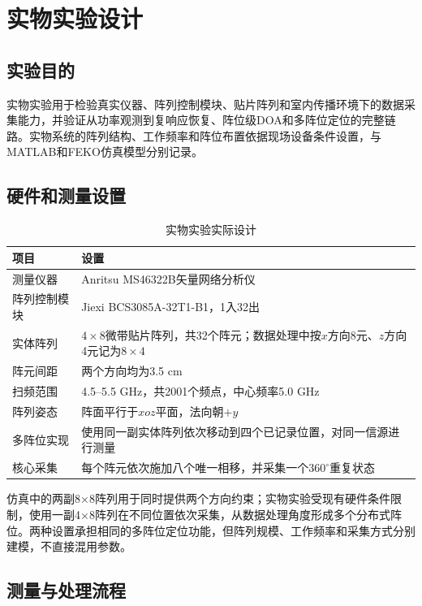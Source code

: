 \documentclass[UTF8,a4paper,12pt]{ctexart}
\begin{document}
\clearpage
\section{实物实验设计}

\subsection{实验目的}

实物实验用于检验真实仪器、阵列控制模块、贴片阵列和室内传播环境下的数据采集能力，并验证从功率观测到复响应恢复、阵位级DOA和多阵位定位的完整链路。实物系统的阵列结构、工作频率和阵位布置依据现场设备条件设置，与MATLAB和FEKO仿真模型分别记录。

\subsection{硬件和测量设置}

\begin{table}[htbp]
\centering
\caption{实物实验实际设计}
\begin{tabularx}{\textwidth}{p{3.2cm}Y}
\toprule
项目 & 设置\\
\midrule
测量仪器 & Anritsu MS46322B矢量网络分析仪\\
阵列控制模块 & Jiexi BCS3085A-32T1-B1，1入32出\\
实体阵列 & $4\times8$微带贴片阵列，共32个阵元；数据处理中按$x$方向8元、$z$方向4元记为$8\times4$\\
阵元间距 & 两个方向均为3.5 cm\\
扫频范围 & 4.5--5.5 GHz，共2001个频点，中心频率5.0 GHz\\
阵列姿态 & 阵面平行于$xoz$平面，法向朝$+y$\\
多阵位实现 & 使用同一副实体阵列依次移动到四个已记录位置，对同一信源进行测量\\
核心采集 & 每个阵元依次施加八个唯一相移，并采集一个$360^\circ$重复状态\\
\bottomrule
\end{tabularx}
\end{table}

仿真中的两副8×8阵列用于同时提供两个方向约束；实物实验受现有硬件条件限制，使用一副4×8阵列在不同位置依次采集，从数据处理角度形成多个分布式阵位。两种设置承担相同的多阵位定位功能，但阵列规模、工作频率和采集方式分别建模，不直接混用参数。

\subsection{测量与处理流程}
\end{document}
